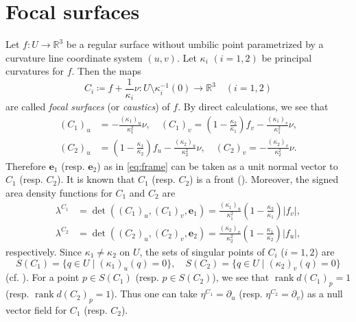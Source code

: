 \documentclass[11pt,a4paper,pdflatex,final]{amsart}
\theoremstyle{plain}
\theoremstyle{definition}
\theoremstyle{remark}
\newcommand{\rank}{\operatorname{rank}}
\newcommand{\0}{\bm{0}}
\newcommand{\R}{\mathbb{R}}
\newcommand{\be}{\bm{e}}
\numberwithin{equation}{section}
\begin{document}
\section{Focal surfaces}\label{sec:focal}
Let $f\colon U\to\R^3$ be a regular surface without umbilic point 
parametrized by a curvature line coordinate system $(u,v)$. 
Let $\kappa_i$ $(i=1,2)$ be principal curvatures for $f$. 
Then the maps 
\begin{equation}\label{eq:caustic}
C_i\coloneqq f+\frac{1}{\kappa_i}\nu\colon U\setminus\kappa_i^{-1}(0)\to\R^3 
\quad (i=1,2)
\end{equation}
are called \textit{focal surfaces} (or \textit{caustics}) of $f$. 
By direct calculations, we see that 
\begin{equation}\label{eq:diff-C}
\begin{aligned}
	(C_1)_u&=-\frac{(\kappa_1)_u}{\kappa_1^2}\nu,\quad 
	(C_1)_v=\left(1-\frac{\kappa_2}{\kappa_1}\right)f_v-\frac{(\kappa_1)_{v}}{\kappa_1^2}\nu,\\
	(C_2)_u&=\left(1-\frac{\kappa_1}{\kappa_2}\right)f_u-\frac{(\kappa_2)_{u}}{\kappa_2^2}\nu,\quad 
	(C_2)_v=-\frac{(\kappa_2)_{v}}{\kappa_2^2}\nu.
\end{aligned}
\end{equation}
Therefore $\be_1$ (resp. $\be_2$) as in \eqref{eq:frame} 
can be taken as a unit normal vector to $C_1$ (resp. $C_2$). 
{It is known that $C_1$ (resp. $C_2$) is a front (\cite[Theorem 7.1.1]{usy-book}).} 
Moreover, the signed area density functions for $C_1$ and $C_2$ are 
\begin{equation}\label{eq:lam-C}
\begin{aligned}
	\lambda^{C_1}&=\det((C_1)_u,(C_1)_v,\be_1)
	=\frac{(\kappa_1)_u}{\kappa_1^2}\left(1-\frac{\kappa_2}{\kappa_1}\right)|f_v|,\\ 
	\lambda^{C_2}&=\det((C_2)_u,(C_2)_v,\be_2)
	=\frac{(\kappa_2)_v}{\kappa_2^2}\left(1-\frac{\kappa_1}{\kappa_2}\right)|f_u|,
\end{aligned}
\end{equation}
respectively. 
Since $\kappa_1\neq \kappa_2$ on $U$, 
the sets of singular points of $C_i$ ($i=1,2$) are 
\[
S(C_1)=\{q\in U\mid (\kappa_1)_u(q)=0\},\quad 
S(C_2)=\{q\in U\mid (\kappa_2)_v(q)=0\}
\]
(cf. \cite{ifrt,porteous1}). 
For a point $p\in S(C_1)$ (resp. $p\in S(C_2)$), 
we see that $\rank d(C_1)_p=1$ (resp. $\rank d(C_2)_p=1$). 
Thus one can take 
$\eta^{C_1}=\partial_u$ (resp. $\eta^{C_2}=\partial_v$) 
as a null vector field for $C_1$ (resp. $C_2$). 
\end{document}
